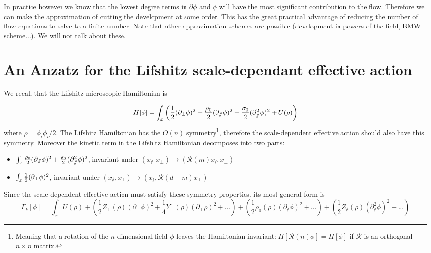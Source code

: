 In practice however we know that the lowest degree terms in $\partial \phi$ and $\phi$ will have the most significant contribution to the flow. Therefore we can make the approximation of cutting the development at some order. This has the great practical advantage of reducing the number of flow equations to solve to a finite number. Note that other approximation schemes are possible (development in powers of the field, BMW scheme...). We will not talk about these.

\section{An Anzatz for the Lifshitz scale-dependant effective action}
We recall that the Lifshitz microscopic Hamiltonian is

\begin{equation}
H[\phi] = \int_x \left( \frac{1}{2}(\partial_{\perp} \phi)^2 + \frac{\rho_0}{2}(\partial_{\sslash} \phi)^2 + \frac{\sigma_0}{2} (\partial_{\sslash}^2 \phi)^2 + U(\rho) \right)
\end{equation}
where $\rho = \phi_i \phi_i/2$. 
The Lifshitz Hamiltonian has the $O(n)$ symmetry\footnote{Meaning that a rotation of the $n$-dimensional field $\phi$ leaves the Hamiltonian invariant: $H[\mathcal{R}(n)\phi] = H[\phi]$ if $\mathcal{R}$ is an orthogonal $n \times n$ matrix.}, therefore the scale-dependent effective action should also have this symmetry. Moreover the kinetic term in the Lifshitz Hamiltonian decomposes into two parts:
\begin{itemize}
\item $\int_{x} \frac{\rho_0}{2}(\partial_{\sslash} \phi)^2 + \frac{\sigma_0}{2} (\partial_{\sslash}^2 \phi)^2$, invariant under $\left(x_\sslash,x_\perp \right) \rightarrow \left(\mathcal{R}(m) x_\sslash, x_\perp\right)$
\item $\int_{x} \frac{1}{2}(\partial_{\perp} \phi)^2$, invariant under $\left(x_\sslash,x_\perp \right) \rightarrow \left(x_\sslash, \mathcal{R}(d-m) x_\perp\right)$
\end{itemize}
Since the scale-dependent effective action must satisfy these symmetry properties, its most general form is
\begin{equation}
\Gamma_k[\phi] = \int_{x} U(\rho) + \left( \frac{1}{2} Z_\perp(\rho) (\partial_\perp \phi)^2 + \frac{1}{4} Y_\perp(\rho) (\partial_\perp \rho)^2 + ... \right) + \left( \frac{1}{2} \rho_0(\rho) (\partial_\sslash \phi)^2 + ... \right) + \left( \frac{1}{2} Z_\sslash(\rho) (\partial_\sslash^2 \phi)^2 + ... \right)
\end{equation}

